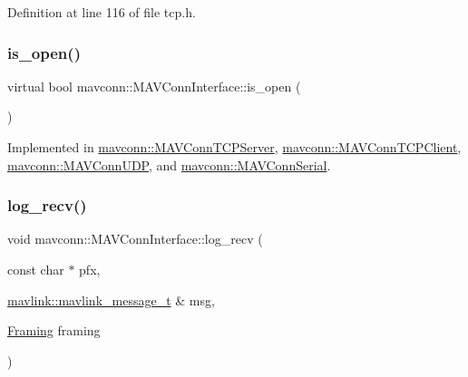 Definition at line 116 of file tcp.\+h.

\mbox{\label{group__mavconn_ga135638c7c953c50bee3143a9e2b35416}} 
\subsubsection{\texorpdfstring{is\_open()}{is\_open()}\hspace{0.1cm}{\footnotesize\ttfamily [5/5]}}
{\footnotesize\ttfamily virtual bool mavconn\+::\+M\+A\+V\+Conn\+Interface\+::is\+\_\+open (\begin{DoxyParamCaption}{ }\end{DoxyParamCaption})\hspace{0.3cm}{\ttfamily [pure virtual]}}



Implemented in \mbox{\hyperlink{group__mavconn_ga7bcb8a571a040f61ad2b61f002edc381}{mavconn\+::\+M\+A\+V\+Conn\+T\+C\+P\+Server}}, \mbox{\hyperlink{group__mavconn_gadcabe763ecf8fc00e123fcf78af9eaf4}{mavconn\+::\+M\+A\+V\+Conn\+T\+C\+P\+Client}}, \mbox{\hyperlink{group__mavconn_ga496ff8d6806b35c993740cc05727f59c}{mavconn\+::\+M\+A\+V\+Conn\+U\+DP}}, and \mbox{\hyperlink{group__mavconn_ga7b2ae62cddd41671b3312050f64b3036}{mavconn\+::\+M\+A\+V\+Conn\+Serial}}.

\mbox{\label{group__mavconn_ga6edf345e262423905ecd6da2966d7b4f}} 
\subsubsection{\texorpdfstring{log\_recv()}{log\_recv()}}
{\footnotesize\ttfamily void mavconn\+::\+M\+A\+V\+Conn\+Interface\+::log\+\_\+recv (\begin{DoxyParamCaption}\item[{const char $\ast$}]{pfx,  }\item[{\mbox{\hyperlink{include__v0_89_2mavlink__types_8h_a63b963764c09dc72f4910c1521e325b9}{mavlink\+::mavlink\+\_\+message\+\_\+t}} \&}]{msg,  }\item[{\mbox{\hyperlink{group__mavconn_gac93e6f8262bcc6008b4882ae6213f494}{Framing}}}]{framing }\end{DoxyParamCaption})\hspace{0.3cm}{\ttfamily [protected]}}



